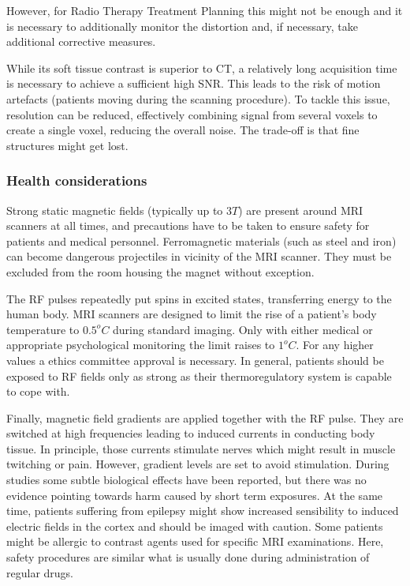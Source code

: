 However, for Radio Therapy Treatment Planning this might not be enough and it is necessary to additionally monitor the distortion and, if necessary, take additional corrective measures. 

While its soft tissue contrast is superior to CT, a relatively long acquisition time is necessary to achieve a sufficient high SNR.
This leads to the risk of motion artefacts (patients moving during the scanning procedure).
To tackle this issue, resolution can be reduced, effectively combining signal from several voxels to create a single voxel, reducing the overall noise.
The trade-off is that fine structures might get lost.



\subsubsection{Health considerations}

Strong static magnetic fields (typically up to $3T$) are present around MRI scanners at all times, and precautions have to be taken to ensure safety for patients and medical personnel.
Ferromagnetic materials (such as steel and iron) can become dangerous projectiles in vicinity of the MRI scanner.
They must be excluded from the room housing the magnet without exception.


The RF pulses repeatedly put spins in excited states, transferring energy to the human body. MRI scanners are designed to limit the rise of a patient's body temperature to $0.5^oC$ during standard imaging. Only with either medical or appropriate psychological monitoring the limit raises to $1^oC$. For any higher values a ethics committee approval is necessary.
In general, patients should be exposed to RF fields only as strong as their thermoregulatory system is capable to cope with.

Finally, magnetic field gradients are applied together with the RF pulse.
They are switched at high frequencies leading to induced currents in conducting body tissue.
In principle, those currents stimulate nerves which might result in muscle twitching or pain.
However, gradient levels are set to avoid stimulation.
During studies some subtle biological effects have been reported, but there was no evidence pointing towards harm caused by short term exposures.
At the same time, patients suffering from epilepsy might show increased sensibility to induced electric fields in the cortex and should be imaged with caution. \cite{Maidment2014}
Some patients might be allergic to contrast agents used for specific MRI examinations.
Here, safety procedures are similar what is usually done during administration of regular drugs. 

